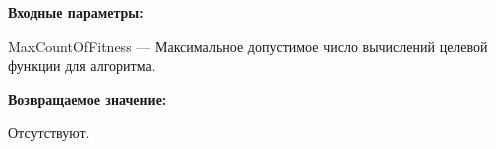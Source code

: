 \textbf{Входные параметры:}

MaxCountOfFitness --- Максимальное допустимое число вычислений целевой функции для алгоритма.

\textbf{Возвращаемое значение:}

Отсутствуют.